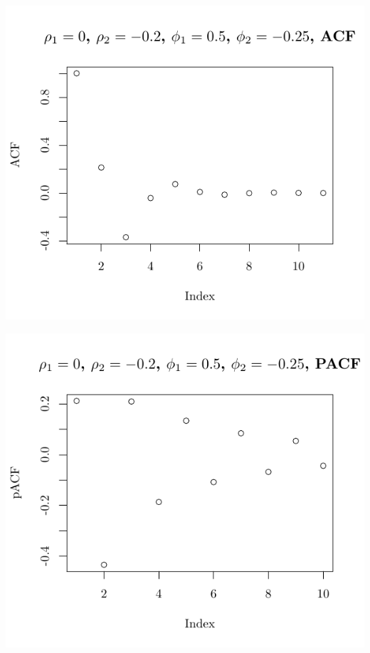 \documentclass[10pt]{paper}\usepackage[]{graphicx}\usepackage[]{color}
\makeatletter
\def\maxwidth{ %
  \ifdim\Gin@nat@width>\linewidth
    \linewidth
  \else
    \Gin@nat@width
  \fi
}
\newenvironment{knitrout}{}{} %
\makeatother
\begin{document}
\begin{knitrout}
{\centering \includegraphics[width=\maxwidth]{figure/graphics-plotter-69} 

}




{\centering \includegraphics[width=\maxwidth]{figure/graphics-plotter-70} 

}





\end{knitrout}
\end{document}
